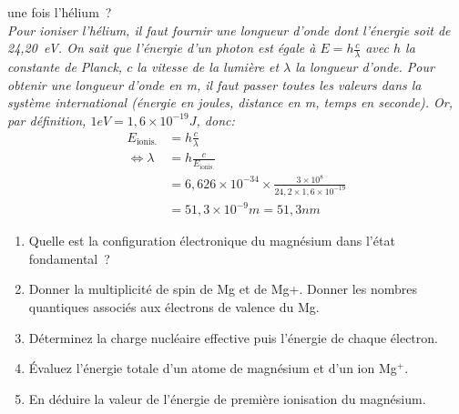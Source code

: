 \begin{enumerate}[\bf 1)]
une fois l'h\'elium~? \\
\textsl{%
Pour ioniser l'hélium, il faut fournir une longueur d'onde dont l'énergie soit de 24,20~eV.
On sait que l'énergie d'un photon est égale à $E=h\frac{c}{\lambda}$ avec $h$ la constante
de Planck, $c$ la vitesse de la lumière et $\lambda$ la longueur d'onde.
Pour obtenir une longueur d'onde en m, il faut passer toutes les valeurs dans la système international
(énergie en joules, distance en m, temps en seconde).
Or, par définition, $1eV=1,6\times10^{-19}J$, donc:
\begin{align*}
E_\text{ionis.} &= h\frac{c}{\lambda}\\
\Leftrightarrow \lambda &=  h\frac{c}{E_\text{ionis.}}\\
                &= 6,626\times 10^{-34} \times \frac{3\times 10^{8}}{24,2\times 1,6\times10^{-19}}\\
                &= 51,3\times10^{-9} m = 51,3 nm
\end{align*}
}
\end{enumerate}
\begin{enumerate}[\bf 1)]
\item Quelle est la configuration \'electronique du magn\'esium dans l'\'etat fondamental~?
\item Donner la multiplicité de spin de Mg et de Mg+.
Donner les nombres quantiques associés aux électrons de valence du Mg.
\item D\'eterminez la charge nucl\'eaire effective puis l'\'energie de chaque \'electron.
\item \'Evaluez l'\'energie totale d'un atome de magn\'esium et d'un ion Mg$^+$.
\item En d\'eduire la valeur de l'\'energie de premi\`ere ionisation du magn\'esium.
\end{enumerate}
